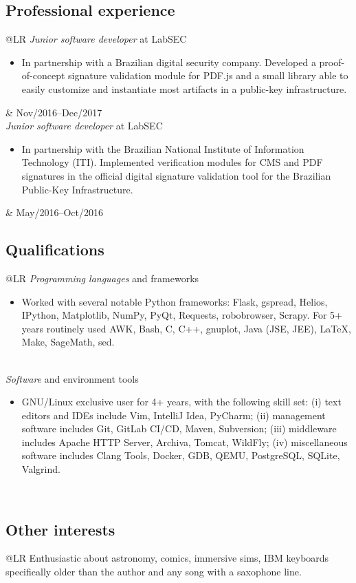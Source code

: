 \documentclass[12pt]{article}
\makeatletter
\newenvironment{datetable}
  {\newcolumntype{R}{>{\raggedleft\arraybackslash}p{0.14\textwidth}}
   \newcolumntype{L}{p{0.84\textwidth}}
   \begin{tabular}{@{\hspace{0mm}}LR}}
  {\end{tabular}}
\newenvironment{contenttable}[1]
  {\subsection*{#1}
   \begin{datetable}}
  {\end{datetable}}
\makeatother
\begin{document}
\begin{contenttable}{Professional experience}
  \textit{Junior software developer} at LabSEC
  \begin{itemize}
    \item In partnership with a Brazilian digital security company. Developed a
        proof-of-concept signature validation module for PDF.js and a small
          library able to easily customize and instantiate most artifacts in a
          public-key infrastructure.
  \end{itemize} & Nov/2016--Dec/2017 \\

  \textit{Junior software developer} at LabSEC
  \begin{itemize}
    \item In partnership with the Brazilian National Institute of Information
        Technology (ITI). Implemented verification modules for CMS and PDF
          signatures in the official digital signature validation tool for the
          Brazilian Public-Key Infrastructure.
  \end{itemize} & May/2016--Oct/2016 \\[-4mm]
\end{contenttable}

\begin{contenttable}{Qualifications}
  \textit{Programming languages} and frameworks
  \begin{itemize}
    \item Worked with several notable Python frameworks: Flask, gspread,
        Helios, IPython, Matplotlib, NumPy, PyQt, Requests, robobrowser,
          Scrapy. For 5+ years routinely used AWK, Bash, C, C++, gnuplot, Java
          (JSE, JEE), \LaTeX{}, Make, SageMath, sed.
  \end{itemize} \\
  \textit{Software} and environment tools
  \begin{itemize}
    \item GNU/Linux exclusive user for 4+ years, with the following skill set:
        (i) text editors and IDEs include Vim, IntelliJ Idea, PyCharm; (ii)
          management software includes Git, GitLab CI/CD, Maven, Subversion;
          (iii) middleware includes Apache HTTP Server, Archiva, Tomcat,
          WildFly; (iv) miscellaneous software includes Clang Tools, Docker,
          GDB, QEMU, PostgreSQL, SQLite, Valgrind.
  \end{itemize} \\[-4mm]
\end{contenttable}

\begin{contenttable}{Other interests}
  Enthusiastic about astronomy, comics, immersive sims, IBM keyboards
    specifically older than the author and any song with a saxophone line. \\
\end{contenttable}


\nobibliography{\jobname}
\end{document}
